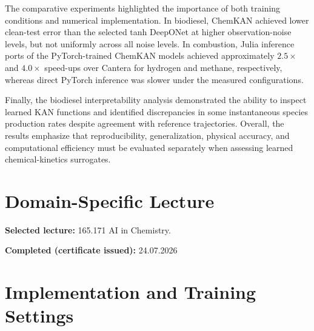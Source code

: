 \documentclass[11pt,a4paper]{article}
\begin{document}
The comparative experiments highlighted
the importance of both training conditions
and numerical implementation. In biodiesel,
ChemKAN achieved lower clean-test error
than the selected tanh DeepONet at higher
observation-noise levels, but not uniformly
across all noise levels. In combustion,
Julia inference ports of the PyTorch-trained
ChemKAN models achieved approximately
$2.5\times$ and $4.0\times$ speed-ups
over Cantera for hydrogen and methane,
respectively, whereas direct PyTorch
inference was slower under the measured
configurations.

Finally, the biodiesel interpretability
analysis demonstrated the ability to inspect learned KAN functions
and identified discrepancies in some instantaneous species
production rates despite agreement with
reference trajectories. Overall, the
results emphasize that reproducibility,
generalization, physical accuracy, and
computational efficiency must be evaluated
separately when assessing learned
chemical-kinetics surrogates.


\section{Domain-Specific Lecture}

\noindent\textbf{Selected lecture:} 165.171 AI in Chemistry.

\noindent\textbf{Completed (certificate issued):} 24.07.2026 

\printbibliography

\newpage
\appendix

\section{Implementation and Training Settings}
\label{app:settings}
\end{document}
